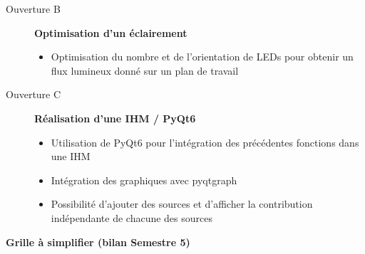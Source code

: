 \documentclass[10pt]{article} %
\begin{document}
\begin{description}
\qquad

	\item[Ouverture B] \textbf{Optimisation d'un éclairement}
	
	\begin{itemize}
		\item Optimisation du nombre et de l'orientation de LEDs pour obtenir un flux lumineux donné sur un plan de travail
	\end{itemize}	

\qquad
	
	\item[Ouverture C] \textbf{Réalisation d'une IHM / PyQt6}
	\begin{itemize}
		\item Utilisation de PyQt6 pour l'intégration des précédentes fonctions dans une IHM
		\item Intégration des graphiques avec pyqtgraph
		\item Possibilité d'ajouter des sources et d'afficher la contribution indépendante de chacune des sources		
	\end{itemize}
	
\end{description}

\newpage

\hypertarget{stepbystep}{}

\textbf{Grille à simplifier (bilan Semestre 5)}
\end{document}
